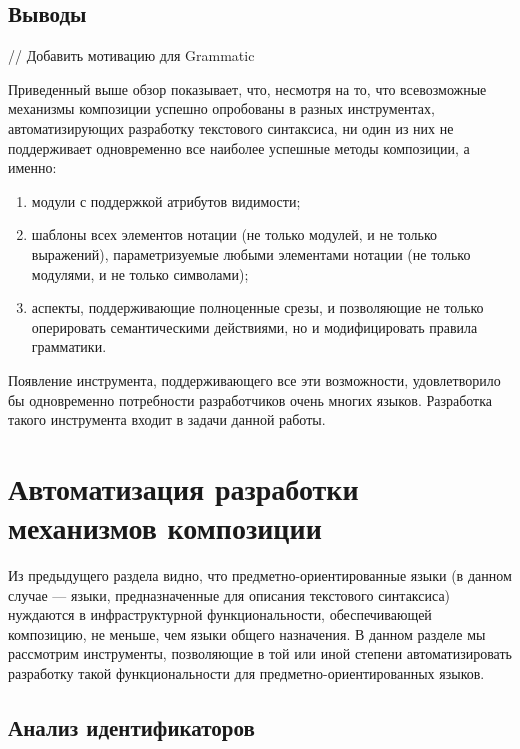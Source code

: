 

\section{Выводы}

// Добавить мотивацию для Grammatic

Приведенный выше обзор показывает, что, несмотря на то, что всевозможные механизмы композиции успешно опробованы в разных инструментах, автоматизирующих разработку текстового синтаксиса, ни один из них не поддерживает одновременно все наиболее успешные методы композиции, а именно:
\begin{enumerate}
\item модули с поддержкой атрибутов видимости;
\item шаблоны всех элементов нотации (не только модулей, и не только выражений), параметризуемые любыми элементами нотации (не только модулями, и не только символами);
\item аспекты, поддерживающие полноценные срезы, и позволяющие не только оперировать семантическими действиями, но и модифицировать правила грамматики.
\end{enumerate}

Появление инструмента, поддерживающего все эти возможности, удовлетворило бы одновременно потребности разработчиков очень многих языков. Разработка такого инструмента входит в задачи данной работы.
	
\chapter{Автоматизация разработки механизмов композиции}

Из предыдущего раздела видно, что предметно-ориентированные языки (в данном случае --- языки, предназначенные для описания текстового синтаксиса) нуждаются в инфраструктурной функциональности, обеспечивающей композицию, не меньше, чем языки общего назначения. В данном разделе мы рассмотрим инструменты, позволяющие в той или иной степени автоматизировать разработку такой функциональности для предметно-ориентированных языков.

\section{Анализ идентификаторов}

